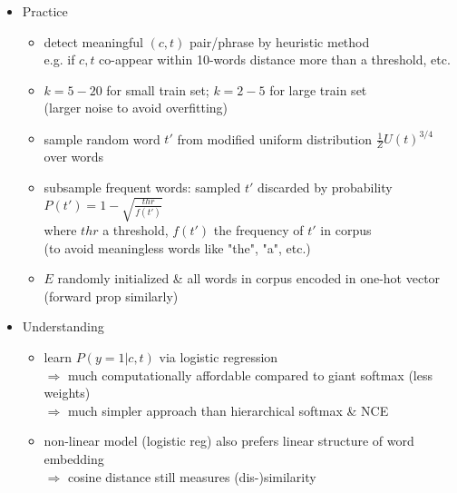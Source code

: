 \begin{itemize}
\begin{itemize}
	\item Practice
		\begin{itemize}
		\item detect meaningful $(c,t)$ pair/phrase by heuristic method \\ 
		e.g. if $c,t$ co-appear within 10-words distance more than a threshold, etc.
		\item $k=5-20$ for small train set; $k=2-5$ for large train set \\
		(larger noise to avoid overfitting)
		\item sample random word $t'$ from modified uniform distribution $\frac 1 Z U(t)^{3/4}$ over words
		\item subsample frequent words: sampled $t'$ discarded by probability $P(t') = 1-\sqrt{\frac {thr} {f(t')}}$ \\
		where $thr$ a threshold, $f(t')$ the frequency of $t'$ in corpus \\
		(to avoid meaningless words like "the", "a", etc.)
		\item $E$ randomly initialized \& all words in corpus encoded in one-hot vector \\
		(forward prop similarly)
		\end{itemize}
	\item Understanding
		\begin{itemize}
		\item learn $P(y=1|c,t)$ via logistic regression \\ 
		$\Rightarrow$ much computationally affordable compared to giant softmax (less weights) \\
		$\Rightarrow$ much simpler approach than hierarchical softmax \& NCE
		\item non-linear model (logistic reg) also prefers linear structure of word embedding \\
		$\Rightarrow$ cosine distance still measures (dis-)similarity
		\end{itemize}
	\end{itemize}
\end{itemize}

